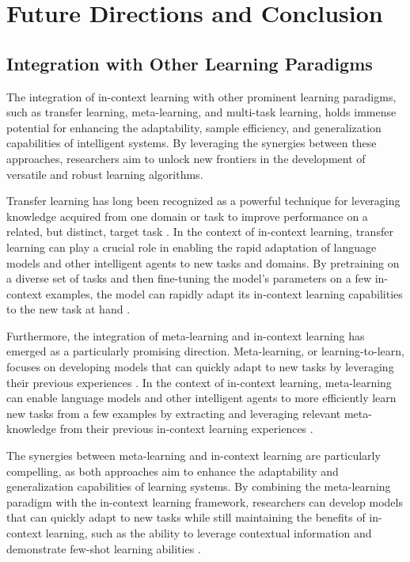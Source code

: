 \documentclass[11pt]{article}
\begin{document}
\section{Future Directions and Conclusion}

\subsection{Integration with Other Learning Paradigms}

The integration of in-context learning with other prominent learning paradigms, such as transfer learning, meta-learning, and multi-task learning, holds immense potential for enhancing the adaptability, sample efficiency, and generalization capabilities of intelligent systems. By leveraging the synergies between these approaches, researchers aim to unlock new frontiers in the development of versatile and robust learning algorithms.

Transfer learning has long been recognized as a powerful technique for leveraging knowledge acquired from one domain or task to improve performance on a related, but distinct, target task \cite{ref68}. In the context of in-context learning, transfer learning can play a crucial role in enabling the rapid adaptation of language models and other intelligent agents to new tasks and domains. By pretraining on a diverse set of tasks and then fine-tuning the model's parameters on a few in-context examples, the model can rapidly adapt its in-context learning capabilities to the new task at hand \cite{ref334}.

Furthermore, the integration of meta-learning and in-context learning has emerged as a particularly promising direction. Meta-learning, or learning-to-learn, focuses on developing models that can quickly adapt to new tasks by leveraging their previous experiences \cite{ref355,ref356}. In the context of in-context learning, meta-learning can enable language models and other intelligent agents to more efficiently learn new tasks from a few examples by extracting and leveraging relevant meta-knowledge from their previous in-context learning experiences \cite{ref357}.

The synergies between meta-learning and in-context learning are particularly compelling, as both approaches aim to enhance the adaptability and generalization capabilities of learning systems. By combining the meta-learning paradigm with the in-context learning framework, researchers can develop models that can quickly adapt to new tasks while still maintaining the benefits of in-context learning, such as the ability to leverage contextual information and demonstrate few-shot learning abilities \cite{ref2}.
\end{document}
